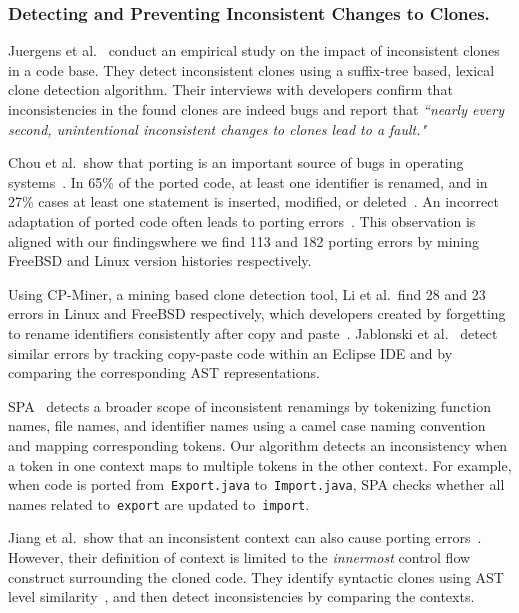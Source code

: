 \documentclass[runningheads,a4paper]{llncs}
\begin{document}
\subsubsection{Detecting and Preventing Inconsistent Changes to Clones.} 
Juergens et al.~\cite{Juergens2009:clone-bug} conduct an empirical
study on the impact of inconsistent clones in a code base. They detect
inconsistent clones using a suffix-tree based, lexical clone detection
algorithm. Their interviews with developers confirm that
inconsistencies in the found clones are indeed bugs and report that
{\em ``nearly every second, unintentional inconsistent changes to
  clones lead to a fault."}

Chou et al.~show that porting is an important source of bugs in
operating systems~\cite{releasenote}. In 65\% of the ported
code, at least one identifier is renamed, and in 27\% cases at least
one statement is inserted, modified, or
deleted~\cite{Li2004:CP-Miner}. An incorrect adaptation of ported code
often leads to porting errors~\cite{Jiang2007}. This
observation is aligned with our findings\textemdash where we find 113
and 182 porting errors by mining FreeBSD and Linux version histories
respectively.

Using CP-Miner, a mining based clone detection tool, Li et al.~find 28 and 23
errors in Linux and FreeBSD respectively, which developers created by
forgetting to rename identifiers consistently after copy and
paste~\cite{Li2004:CP-Miner}. Jablonski et
al.~\cite{Jablonski2007:CReN} detect similar errors by tracking
copy-paste code within an Eclipse IDE and by comparing the
corresponding AST representations.  

SPA~\cite{Ray2013:spa} detects a broader scope of inconsistent renamings by tokenizing
function names, file names, and identifier names using a camel case
naming convention and mapping corresponding tokens. Our algorithm
detects an inconsistency when a token in one context maps to multiple
tokens in the other context.  For example, when code is ported
from~\texttt{Export.java} to~\texttt{Import.java}, SPA checks
whether all names related to~\texttt{export} are updated
to~\texttt{import}.

Jiang et al.~show that an inconsistent context can also cause porting
errors~\cite{Jiang2007}. However, their definition of
context is limited to the {\em innermost} control flow construct
surrounding the cloned code. They identify syntactic clones using AST
level similarity~\cite{Jiang2007a}, and then detect
inconsistencies by comparing the contexts. 
\end{document}
